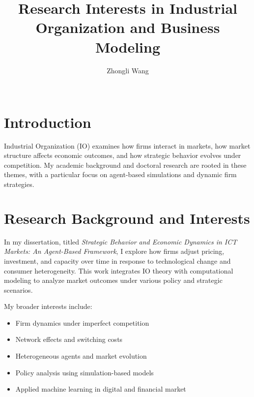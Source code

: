\documentclass[11pt,a4paper]{article}
\title{Research Interests in Industrial Organization and Business Modeling}
\author{%
Zhongli Wang \\\\%
}
\begin{document}
\maketitle


\section*{Introduction}
Industrial Organization (IO) examines how firms interact in markets, how market structure affects economic outcomes, and how strategic behavior evolves under competition. My academic background and doctoral research are rooted in these themes, with a particular focus on agent-based simulations and dynamic firm strategies.

\section*{Research Background and Interests}
In my dissertation, titled \textit{Strategic Behavior and Economic Dynamics in ICT Markets: An Agent-Based Framework}, I explore how firms adjust pricing, investment, and capacity over time in response to technological change and consumer heterogeneity. This work integrates IO theory with computational modeling to analyze market outcomes under various policy and strategic scenarios.

My broader interests include:
\begin{itemize}
  \item Firm dynamics under imperfect competition
  \item Network effects and switching costs
  \item Heterogeneous agents and market evolution
  \item Policy analysis using simulation-based models
  \item Applied machine learning in digital and financial market
\end{itemize}
\end{document}
